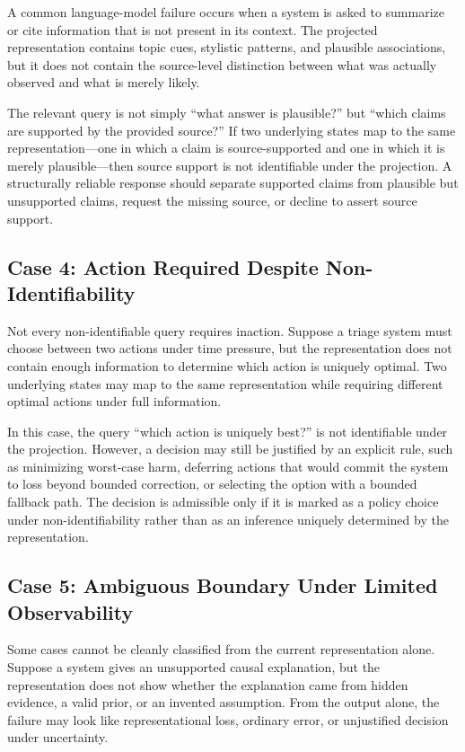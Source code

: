 \documentclass[11pt]{article}
\begin{document}
A common language-model failure occurs when a system is asked to summarize or cite information that is not present in its context. The projected representation contains topic cues, stylistic patterns, and plausible associations, but it does not contain the source-level distinction between what was actually observed and what is merely likely.

The relevant query is not simply ``what answer is plausible?'' but ``which claims are supported by the provided source?'' If two underlying states map to the same representation---one in which a claim is source-supported and one in which it is merely plausible---then source support is not identifiable under the projection. A structurally reliable response should separate supported claims from plausible but unsupported claims, request the missing source, or decline to assert source support.

\subsection{Case 4: Action Required Despite Non-Identifiability}

Not every non-identifiable query requires inaction. Suppose a triage system must choose between two actions under time pressure, but the representation does not contain enough information to determine which action is uniquely optimal. Two underlying states may map to the same representation while requiring different optimal actions under full information.

In this case, the query ``which action is uniquely best?'' is not identifiable under the projection. However, a decision may still be justified by an explicit rule, such as minimizing worst-case harm, deferring actions that would commit the system to loss beyond bounded correction, or selecting the option with a bounded fallback path. The decision is admissible only if it is marked as a policy choice under non-identifiability rather than as an inference uniquely determined by the representation.

\subsection{Case 5: Ambiguous Boundary Under Limited Observability}

Some cases cannot be cleanly classified from the current representation alone. Suppose a system gives an unsupported causal explanation, but the representation does not show whether the explanation came from hidden evidence, a valid prior, or an invented assumption. From the output alone, the failure may look like representational loss, ordinary error, or unjustified decision under uncertainty.
\end{document}
